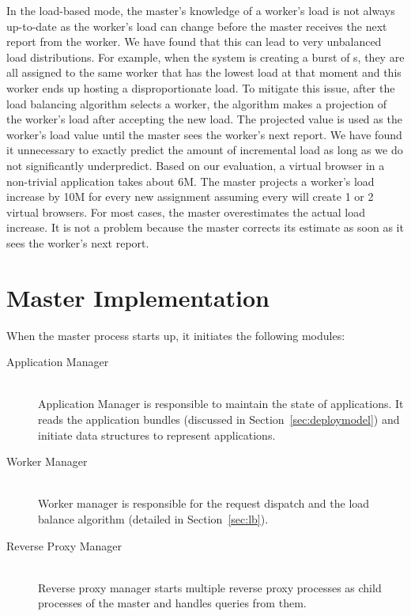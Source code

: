 In the load-based mode, the master's knowledge of a worker's load is not
always up-to-date as the worker's load can change before the master receives the
next report from the worker. We have found that this can lead to very unbalanced load
distributions. For example, when the system is creating a burst of \appins{}s,
they are all assigned to the same worker that has the lowest load at that
moment and this worker ends up hosting a disproportionate load.  To mitigate
this issue,  after the load balancing algorithm selects a worker, the
algorithm makes a projection of the worker's load after accepting the new
load. The projected value is used as the worker's load value  until the master
sees the worker's next report.  We have found it unnecessary to exactly 
predict the amount of incremental load as long as we do not significantly 
underpredict.  Based on our evaluation, a virtual
browser in a non-trivial application takes about 6M.  The master projects a
worker's load increase by 10M for every new \appins assignment assuming every
\appins will create 1 or 2 virtual browsers.  For most cases, the master
overestimates the actual load increase. It is not a problem because the master
corrects its estimate as soon as it sees the worker's next report. 

\section{Master Implementation}

When the master process starts up, it initiates the following modules:

\begin{description}
\item[Application Manager] \hfill \\
Application Manager is responsible to maintain the state of applications. It
reads the application bundles (discussed in Section~\ref{sec:deploymodel}) and
initiate data structures to represent applications.

\item[Worker Manager] \hfill \\
Worker manager is responsible for the request dispatch
and the load balance algorithm (detailed in Section~\ref{sec:lb}).

\item[Reverse Proxy Manager] \hfill \\
Reverse proxy manager starts multiple reverse proxy processes as child
processes of the master and handles queries from them.
\end{description}

